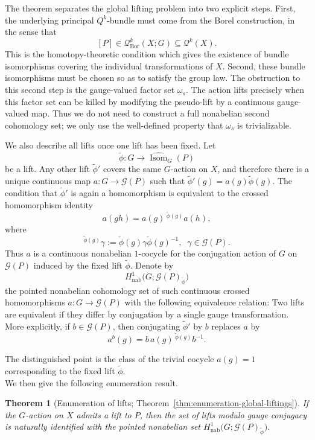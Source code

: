 \documentclass[11pt,a4paper]{article}
\numberwithin{equation}{section}
\newtheorem*{theorem}{Theorem}
\theoremstyle{named}
\begin{document}
 The theorem separates the global lifting problem into two explicit steps. First, the underlying principal \(Q^k\)-bundle must come from the Borel
construction, in the sense that
\[
[P]\in\mathcal Q^k_{\mathrm{Bor}}(X;G)\subseteq\mathcal Q^k(X).
\]
This is the homotopy-theoretic condition which gives the existence of bundle isomorphisms covering the individual transformations of \(X\). Second, these bundle isomorphisms must be chosen so as to satisfy the group law. The obstruction to this second step is the gauge-valued factor set \(\omega_s\). The action lifts precisely when this factor set can be killed by modifying the pseudo-lift by a continuous gauge-valued map. Thus we do not need to construct a full nonabelian second cohomology set; we only use the well-defined property that \(\omega_s\) is trivializable.

We also describe all lifts once one lift has been fixed. Let
\[
\widetilde\phi:G\longrightarrow\widehat{\operatorname{Isom}}_G(P)
\]
be a lift. Any other lift \(\widetilde\phi'\) covers the same \(G\)-action on \(X\), and therefore there is a unique continuous map $a:G\longrightarrow\mathcal G(P)$
such that
$\widetilde\phi'(g)=a(g)\widetilde\phi(g)$.
The condition that \(\widetilde\phi'\) is again a homomorphism is equivalent to the crossed homomorphism identity
\[
a(gh)=a(g)\,{}^{\widetilde\phi(g)}a(h),
\]
where
\[
{}^{\widetilde\phi(g)}\gamma
:=
\widetilde\phi(g)\gamma\widetilde\phi(g)^{-1},\;\;
\gamma\in\mathcal G(P).
\]
Thus \(a\) is a continuous nonabelian \(1\)-cocycle for the conjugation action of \(G\) on \(\mathcal G(P)\) induced by the fixed lift
\(\widetilde\phi\). Denote by \[H^1_{\mathrm{nab}} \bigl(G;\mathcal G(P)_{\widetilde\phi}\bigr)\]
 the pointed nonabelian cohomology set of such continuous crossed homomorphisms $a:G\longrightarrow\mathcal G(P)$ with the following equivalence relation: Two lifts are equivalent if they differ by conjugation by a single gauge transformation. More explicitly, if \(b\in\mathcal G(P)\), then conjugating \(\widetilde\phi'\) by \(b\) replaces \(a\) by
\[
a^b(g)
=
b\,a(g)\,{}^{\widetilde\phi(g)}b^{-1}.
\]

\noindent The distinguished point is the class of the trivial cocycle \(a(g)=1\) corresponding to the fixed lift \(\widetilde\phi\). \\
We then give the following enumeration result.

\begin{theorem}[Enumeration of lifts; Theorem~\ref{thm:enumeration-global-liftings}] \label{thm:intro-enumeration} If the \(G\)-action on $X$ admits a lift to \(P\), then the set of lifts modulo gauge conjugacy is naturally identified with the pointed nonabelian set $H^1_{\mathrm{nab}} \bigl(G;\mathcal G(P)_{\widetilde\phi}\bigr)$. 
\end{theorem} 
\end{document}
